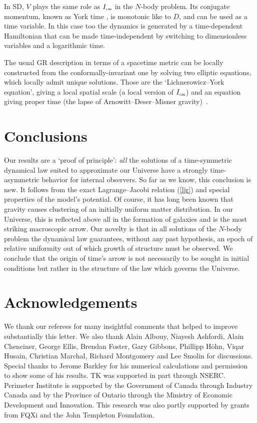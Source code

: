 \documentclass[prl,nofootinbib,twocolumn,superscriptaddress]{revtex4}
\newcommand{\st}[1]{\text{\tiny \rm #1}}
\begin{document}
In SD, $V$ plays the same role as $I_\st{cm}$ in the $N$-body problem. Its conjugate momentum, known as York time \cite{LongPaper}, is monotonic like to $D$, and can be used as a time variable. In this case too the dynamics is generated by a time-dependent Hamiltonian that can be made time-independent by switching to dimensionless variables and a logarithmic time.

The usual GR description in terms of a spacetime metric can be locally constructed from the conformally-invariant one by solving two elliptic equations, which locally admit unique solutions. Those are the `Lichnerowicz--York equation', giving a local spatial scale (a local version of $I_\st{cm}$) and an equation giving proper time (the lapse of Arnowitt--Deser--Misner gravity)~\cite{LongPaper}.



\section{Conclusions}

Our results are a `proof of principle': {\it all} the solutions of a time-symmetric dynamical law suited to approximate our Universe have a strongly time-asymmetric behavior for internal observers. So far as we know, this conclusion is new. It follows from the exact Lagrange--Jacobi relation (\ref{ljr}) and special properties of the model's potential. Of course, it has long been known that gravity causes clustering of an initially uniform matter distribution. In our Universe, this is reflected above all in the formation of galaxies and is the most striking macroscopic arrow. Our novelty is that in all solutions of the $N$-body problem the dynamical law guarantees, without any past hypothesis, an epoch of relative uniformity out of which growth of structure must be observed. We conclude that the origin of time's arrow is not necessarily to be sought in initial conditions but rather in the structure of the law which governs the Universe.

\section{Acknowledgements}

We thank our referees for many insightful comments that helped to improve substantially this letter.
We also thank Alain Albouy, Niayesh Ashfordi, Alain Chenciner, George Ellis, Brendan Foster, Gary Gibbons, Phillipp H{\"o}hn, Viqar Husain, Christian Marchal, Richard Montgomery and Lee Smolin for discussions. Special thanks to Jerome Barkley for his numerical calculations and permission to show some of his results.
TK was supported in part through NSERC.
Perimeter Institute is supported by the Government of Canada through Industry Canada
and by the Province of Ontario through the Ministry of Economic Development and Innovation. 
This research was also partly supported by grants from FQXi and the John Templeton Foundation.
  
\end{document}
